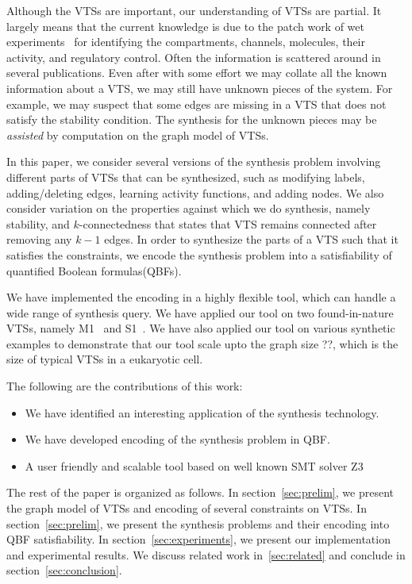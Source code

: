 %
Although the VTSs are important, our understanding of VTSs are partial.
%
It largely means that the current knowledge is due to the patch work
of wet experiments~\cite{model} for identifying the compartments,
channels, molecules, their activity, and regulatory control.
%
Often the information is scattered around in several publications.
%
Even after with some effort we may collate all the known information about
a VTS, we may still have unknown pieces of the system.
%
%
For example, we may suspect that some edges are missing in a VTS that
does not satisfy the stability condition.
%
The synthesis for the unknown pieces may be {\em assisted} by computation on
the graph model of VTSs.
%

In this paper, we consider several versions of the synthesis problem
involving different parts of VTSs that can be synthesized, such as
modifying labels, adding/deleting edges, learning activity functions,
and adding nodes.
%
We also consider variation on the properties against which we do synthesis,
namely stability, and $k$-connectedness that states
that VTS remains connected after removing any $k-1$ edges.
%
In order to synthesize the parts of a VTS such that it satisfies the
constraints, we encode the synthesis problem into a satisfiability of
quantified Boolean formulas(QBFs). 
%

We have implemented the encoding in a highly flexible tool,
which can handle a wide range of synthesis query.
%
We have applied our tool on two found-in-nature VTSs, namely
M1~\cite{} and S1~\cite{}.
%
We have also applied our tool on various synthetic examples to
demonstrate that our tool scale upto the graph size ??, which
is the size of typical VTSs in a eukaryotic cell.

The following are the contributions of this work:
\begin{itemize}
\item We have identified an interesting application of
  the synthesis technology.
\item We have developed encoding of the synthesis problem in QBF.
\item A user friendly and scalable tool based on well known SMT solver Z3
\end{itemize}

The rest of the paper is organized as follows.
%
In section~\ref{sec:prelim}, we present the graph model of VTSs and encoding of several
constraints on VTSs.
%
In section~\ref{sec:prelim}, we present the synthesis problems and their
encoding into QBF satisfiability.
%
In section~\ref{sec:experiments}, we present our implementation and experimental results.
%
We discuss related work in~\ref{sec:related} and conclude in section~\ref{sec:conclusion}.



